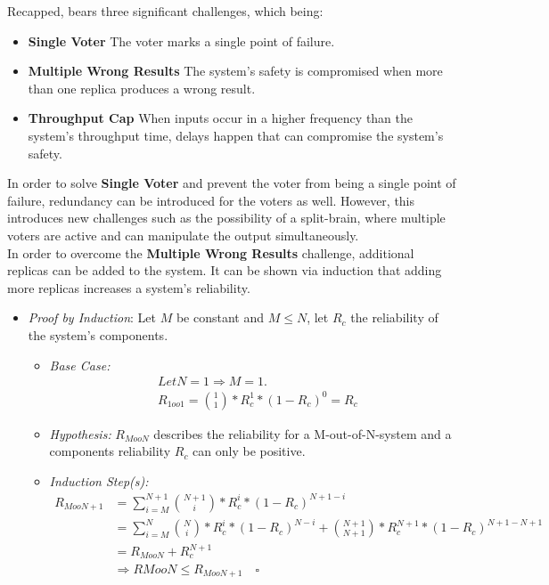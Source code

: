 \noindent Recapped,  bears three significant challenges, which being:

\newcommand{\ChallengeWR}{\textbf{Multiple Wrong Results}\xspace}
\newcommand{\ChallengeVoter}{\textbf{Single Voter}\xspace}
\newcommand{\ChallengeThrough}{\textbf{Throughput Cap}\xspace}
\begin{itemize}
\item \ChallengeVoter The voter marks a single point of failure.
\item \ChallengeWR The system's safety is compromised when more than one replica produces a wrong result.
\item \ChallengeThrough When inputs occur in a higher frequency than the system's throughput time, delays happen that can compromise the system's safety.
\end{itemize}

In order to solve \ChallengeVoter and prevent the voter from being a single point of failure, redundancy can be introduced for the voters as well.
However, this introduces new challenges such as the possibility of a split-brain, where multiple voters are active and can manipulate the output simultaneously.
\\

In order to overcome the \ChallengeWR challenge, additional replicas can be added to the system.
It can be shown via induction that adding more replicas increases a system's reliability.

\begin{itemize}
\item \emph{Proof by Induction}: Let $M$ be constant and $M \leq N$, let $R_{c}$ the reliability of the system's components.
\begin{itemize}[label=$\lozenge$, itemsep=2ex]
\item \emph{Base Case:}
\begin{align*}
&Let N = 1 \Rightarrow M = 1.\\
&R_{1oo1} = {1 \choose 1} * R_{c}^1 * (1 - R_{c})^0 = R_{c}
\end{align*}

\item \emph{Hypothesis:} $R_{MooN}$ describes the reliability for a M-out-of-N-system and a components reliability $R_{c}$ can only be positive.

\item \emph{Induction Step(s):}
\begin{align*}
R_{MooN+1} &= \sum_{i=M}^{N+1} {N + 1 \choose i} * R_{c}^i * (1 - R_c)^{N + 1 - i}\\
&= \sum_{i=M}^{N} {N \choose i} * R_{c}^i * (1 - R_c)^{N - i} + {N+1 \choose N+1} * R_c^{N+1} * (1 - R_c)^{N+1 - N+1}\\
&= R_{MooN} + R_c^{N+1} \\
&\Rightarrow R{MooN} \leq R_{MooN+1} \quad \square
\end{align*}
\end{itemize}
\end{itemize}


